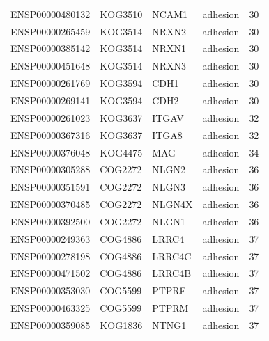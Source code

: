 \begin{tabular}{llllr}
\rowcolor{gray!6}  ENSP00000480132 & KOG3510 & NCAM1 & adhesion & 30\\
\addlinespace
ENSP00000265459 & KOG3514 & NRXN2 & adhesion & 30\\
\rowcolor{gray!6}  ENSP00000385142 & KOG3514 & NRXN1 & adhesion & 30\\
ENSP00000451648 & KOG3514 & NRXN3 & adhesion & 30\\
\rowcolor{gray!6}  ENSP00000261769 & KOG3594 & CDH1 & adhesion & 30\\
ENSP00000269141 & KOG3594 & CDH2 & adhesion & 30\\
\addlinespace
\rowcolor{gray!6}  ENSP00000261023 & KOG3637 & ITGAV & adhesion & 32\\
ENSP00000367316 & KOG3637 & ITGA8 & adhesion & 32\\
\rowcolor{gray!6}  ENSP00000376048 & KOG4475 & MAG & adhesion & 34\\
ENSP00000305288 & COG2272 & NLGN2 & adhesion & 36\\
\rowcolor{gray!6}  ENSP00000351591 & COG2272 & NLGN3 & adhesion & 36\\
\addlinespace
ENSP00000370485 & COG2272 & NLGN4X & adhesion & 36\\
\rowcolor{gray!6}  ENSP00000392500 & COG2272 & NLGN1 & adhesion & 36\\
ENSP00000249363 & COG4886 & LRRC4 & adhesion & 37\\
\rowcolor{gray!6}  ENSP00000278198 & COG4886 & LRRC4C & adhesion & 37\\
ENSP00000471502 & COG4886 & LRRC4B & adhesion & 37\\
\addlinespace
\rowcolor{gray!6}  ENSP00000353030 & COG5599 & PTPRF & adhesion & 37\\
ENSP00000463325 & COG5599 & PTPRM & adhesion & 37\\
\rowcolor{gray!6}  ENSP00000359085 & KOG1836 & NTNG1 & adhesion & 37\\
\bottomrule
\end{tabular}
